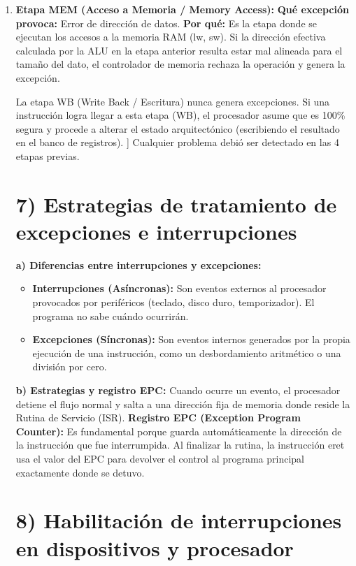 \documentclass[12pt]{article}
\begin{document}
\begin{itemize}
\begin{enumerate}
    \item \textbf{Etapa MEM (Acceso a Memoria / Memory Access):} 
    \textbf{Qué excepción provoca:} Error de dirección de datos. 
    \textbf{Por qué:} Es la etapa donde se ejecutan los accesos a la memoria RAM (lw, sw). Si la dirección efectiva calculada por la ALU en la etapa anterior resulta estar mal alineada para el tamaño del dato, el controlador de memoria rechaza la operación y genera la excepción.

La etapa WB (Write Back / Escritura) nunca genera excepciones.  Si una instrucción logra llegar a esta etapa (WB), el procesador asume que es 100\% segura y procede a alterar el estado arquitectónico (escribiendo el resultado en el banco de registros). ] Cualquier problema debió ser detectado en las 4 etapas previas. 

\vspace{1cm}

\section*{7) Estrategias de tratamiento de excepciones e interrupciones} 

\textbf{a) Diferencias entre interrupciones y excepciones:} 
\begin{itemize}
    \item \textbf{Interrupciones (Asíncronas):} Son eventos externos al procesador provocados por periféricos (teclado, disco duro, temporizador).  El programa no sabe cuándo ocurrirán. 
    \item \textbf{Excepciones (Síncronas):} Son eventos internos generados por la propia ejecución de una instrucción, como un desbordamiento aritmético o una división por cero. 
\end{itemize}

\textbf{b) Estrategias y registro EPC:} 
Cuando ocurre un evento, el procesador detiene el flujo normal y salta a una dirección fija de memoria donde reside la Rutina de Servicio (ISR). 
\textbf{Registro EPC (Exception Program Counter):} Es fundamental porque guarda automáticamente la dirección de la instrucción que fue interrumpida.  Al finalizar la rutina, la instrucción eret usa el valor del EPC para devolver el control al programa principal exactamente donde se detuvo. 

\vspace{1cm}

\section*{8) Habilitación de interrupciones en dispositivos y procesador} 


\end{enumerate}
\end{itemize}
\end{document}

